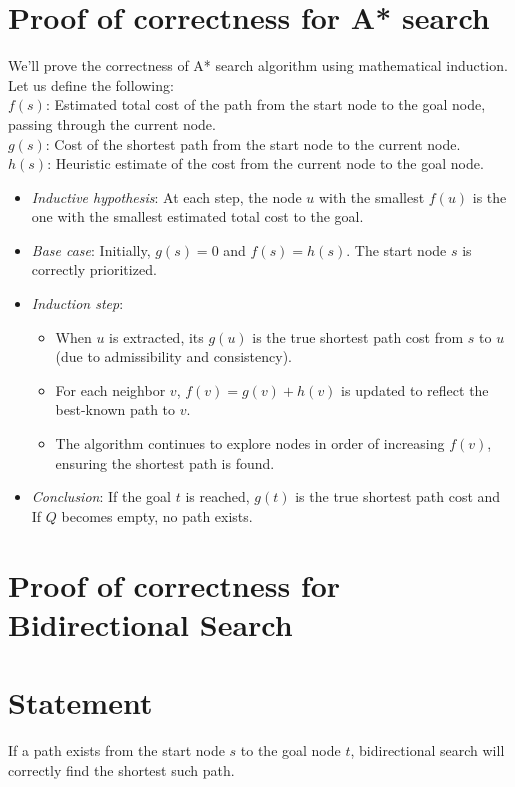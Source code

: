 \begin{appendices}
	\section{Proof of correctness for A* search}\label{appendix:astar:correctness}
	We'll prove the correctness of A* search algorithm using mathematical induction. Let us define the following: \\
	$f(s)$: Estimated total cost of the path from the start node to the goal node, passing through the current node. \\
	$g(s)$: Cost of the shortest path from the start node to the current node. \\
	$h(s)$: Heuristic estimate of the cost from the current node to the goal node.
	\begin{itemize}
		\item \textit{Inductive hypothesis}: At each step, the node $u$ with the smallest $f(u)$ is the one with the smallest estimated total cost to the goal.
		\item \textit{Base case}: Initially, $g(s)=0$ and $f(s)=h(s)$. The start node $s$ is correctly prioritized.
		\item \textit{Induction step}: 
			\begin{itemize}
				\item When $u$ is extracted, its $g(u)$ is the true shortest path cost from $s$ to $u$ (due to admissibility and consistency).
				\item For each neighbor $v$, $f(v)=g(v)+h(v)$ is updated to reflect the best-known path to $v$.
				\item The algorithm continues to explore nodes in order of increasing $f(v)$, ensuring the shortest path is found.
			\end{itemize}
		\item \textit{Conclusion}: If the goal $t$ is reached, $g(t)$ is the true shortest path cost and If $Q$ becomes empty, no path exists.
	\end{itemize}
\section{Proof of correctness for Bidirectional Search}\label{appendix:bidirectional:correctness}
\section*{Statement}
If a path exists from the start node $s$ to the goal node $t$, bidirectional search will correctly find the shortest such path.


\end{appendices}
